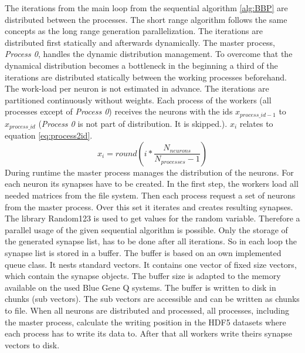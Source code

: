 The iterations from the main loop from the sequential algorithm \ref{alg:BBP} are distributed between the processes.
The short range algorithm follows the same concepts as the long range generation parallelization.
The iterations are distributed first statically and afterwards dynamically.
The master process, \emph{Process 0}, handles the dynamic distribution management.
To overcome that the dynamical distribution becomes a bottleneck in the beginning a third of the iterations are distributed
statically between the working processes beforehand.
The work-load per neuron is not estimated in advance.
The iterations are partitioned continuously without weights.
Each process of the workers (all processes except of \emph{Process 0}) receives the neurons with the ids $x_{process\_id-1}$
to $x_{process\_id}$ (\emph{Process 0} is not part of distribution. It is skipped.).
$x_i$ relates to equation \ref{eq:process2id}.
\begin{equation}
	x_i = round(i * \frac{N_{neurons}}{N_{processes}-1})
	\label{eq:process2id}
\end{equation}
During runtime the master process manages the distribution of the neurons. For each neuron 
its synapses have to be created. In the first step, the workers load all needed matrices from the file system.
Then each process request a set of neurons from the master process. Over this set it iterates and creates resulting
synapses. The library Random123 is used to get values for the random variable. Therefore a parallel usage of 
the given sequential algorithm is possible. Only the storage of the generated synapse list, has to be done 
after all iterations. So in each loop the synapse list is stored in a buffer.
The buffer is based on an own implemented queue class. It nests standard vectors.
It contains one vector of fixed size vectors, which contain the synapse objects.
The buffer size is adapted to 
the memory available on the used Blue Gene Q systems.
The buffer is written to disk in chunks (sub vectors). The sub vectors are
accessible and can be written as chunks to file.
When all neurons are distributed and processed, all processes, including the master process, calculate the writing position
in the HDF5 datasets where each process has to write its data to. After that all workers write theirs synapse vectors to
disk.




